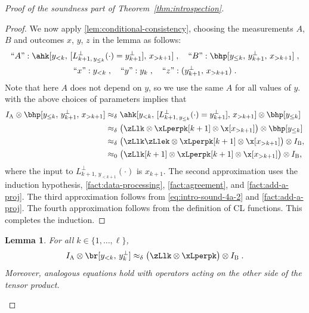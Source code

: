 \documentclass[11pt]{article}
\newtheorem{lemma}[theorem]{Lemma}
\theoremstyle{definition}
\newcommand{\Id}{\ensuremath{I}}
\newcommand{\ia}{\Id_\alice}
\newcommand{\ib}{\Id_\bob}
\newcommand{\labelstyle}[1]{\ensuremath{\textsc{#1}}\xspace}
\newcommand{\alice}{\labelstyle{A}}
\newcommand{\bob}{\labelstyle{B}}
\begin{document}
\begin{proof}[Proof of the soundness part of Theorem~\ref{thm:introspection}]
\begin{proof}
    We now apply \cref{lem:conditional-consistency}, choosing the measurements
    $A$, $B$ and outcomes $x$, $y$, $z$ in the lemma as follows:
    \begin{gather*}
      \text{``$A$''}: \ahk[{y_{<k},\, [L^\perp_{k+1,\, y_{\le k}}(\cdot) =
          y^\perp_{k+1}],\, x_{>k+1}}]\;, \quad
      \text{``$B$''}: \bhp[y_{\le k},\, y^\perp_{k+1},\, x_{>k+1}]\;, \\
      \text{``$x$''}: y_{<k}\;, \quad
      \text{``$y$''}: y_k\;, \quad
      \text{``$z$''}: (y^\perp_{k+1},\, x_{>k+1})\;.
    \end{gather*}
		Note that here $A$ does not depend on $y$, so we use the same $A$ for all values of $y$. 
     with the above choices of parameters
    implies that
    \begin{equation*}
      \begin{split}
        \ia \otimes \bhp[y_{\le k},\, y^\perp_{k+1},\, x_{>k+1}]
        & \approx_\delta \ahk[{y_{<k},\, [L^\perp_{k+1,\, y_{\le k}}(\cdot) =
          y^\perp_{k+1}],\, x_{>k+1}}] \otimes \bhp[y_{\le k}]\\
        & \approx_\delta  \bigl( \zLlk \otimes \xLperpk[k+1] \otimes \x[x_{>k+1}]
        \bigr) \otimes \bhp[y_{\le k}]\\
        & \approx_\delta \bigl( \zLlk \zLlek \otimes \xLperpk[k+1] \otimes \x[x_{>k+1}]
        \bigr) \otimes \ib,\\
        & \approx_0 \bigl( \zLlk[k+1] \otimes \xLperpk[k+1] \otimes \x[x_{>k+1}]
        \bigr) \otimes \ib,
      \end{split}
    \end{equation*}
    where the input to $L^\perp_{k+1,\, y_{<k+1}}(\cdot)$ is $x_{k+1}$.
    The second approximation uses the induction hypothesis,
    \cref{fact:data-processing}, \cref{fact:agreement}, and
    \cref{fact:add-a-proj}.
    The third approximation follows from \cref{eq:intro-sound-4a-2} and
    \cref{fact:add-a-proj}.
    The fourth approximation follows from the definition of CL functions.
    This completes the induction.
  \end{proof}

  \begin{lemma}
    For all $k \in \{1, \ldots, \ell\}$,
	  \begin{equation}
      \label{eq:intro-sound-4}
      \ia \otimes \br[y_{<k},\, y_k^\perp] \approx_\delta
      \bigl( \zLlk \otimes \xLperpk \bigr) \otimes \ib \;.
    \end{equation}
    Moreover, analogous equations hold with operators acting on the other side
    of the tensor product.
  \end{lemma}


\end{proof}
\end{document}

